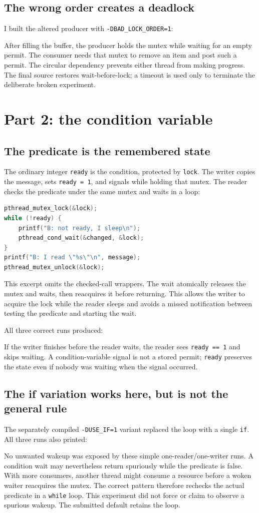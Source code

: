 \documentclass[12pt]{article}
\begin{document}
\subsection{The wrong order creates a deadlock}
I built the altered producer with \texttt{-DBAD\_LOCK\_ORDER=1}:

After filling the buffer, the producer holds the mutex while waiting for
an empty permit. The consumer needs that mutex to remove an item and post
such a permit. The circular dependency prevents either thread from making
progress. The final source restores wait-before-lock; a timeout is used
only to terminate the deliberate broken experiment.

\clearpage
\section{Part 2: the condition variable}
\subsection{The predicate is the remembered state}
The ordinary integer \texttt{ready} is the condition, protected by
\texttt{lock}. The writer copies the message, sets \texttt{ready = 1},
and signals while holding that mutex. The reader checks the predicate
under the same mutex and waits in a loop:
\begin{lstlisting}[language=C]
pthread_mutex_lock(&lock);
while (!ready) {
    printf("B: not ready, I sleep\n");
    pthread_cond_wait(&changed, &lock);
}
printf("B: I read \"%s\"\n", message);
pthread_mutex_unlock(&lock);
\end{lstlisting}
This excerpt omits the checked-call wrappers. The wait atomically releases
the mutex and waits, then reacquires it before returning. This allows the
writer to acquire the lock while the reader sleeps and avoids a missed
notification between testing the predicate and starting the wait.

All three correct runs produced:

If the writer finishes before the reader waits, the reader sees
\texttt{ready == 1} and skips waiting. A condition-variable signal is not
a stored permit; \texttt{ready} preserves the state even if nobody was
waiting when the signal occurred.

\subsection{The if variation works here, but is not the general rule}
The separately compiled \texttt{-DUSE\_IF=1} variant replaced the loop
with a single \texttt{if}. All three runs also printed:

No unwanted wakeup was exposed by these simple one-reader/one-writer runs.
A condition wait may nevertheless return spuriously while the predicate
is false. With more consumers, another thread might consume a resource
before a woken waiter reacquires the mutex. The correct pattern therefore
rechecks the actual predicate in a \texttt{while} loop. This experiment
did not force or claim to observe a spurious wakeup. The submitted default
retains the loop.
\end{document}
